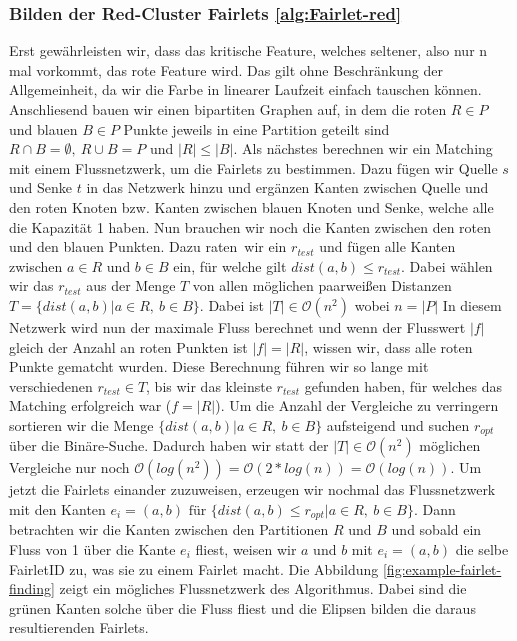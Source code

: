         \subsubsection{Bilden der Red-Cluster Fairlets \ref{alg:Fairlet-red}}
            Erst gewährleisten wir, dass das kritische Feature, welches seltener, also nur n mal vorkommt, das rote Feature wird. Das gilt ohne Beschränkung der Allgemeinheit, da wir die Farbe in linearer Laufzeit einfach tauschen können. \newline
            Anschliesend bauen wir einen bipartiten Graphen auf, in dem die roten $R \in P$ und blauen $B \in P$ Punkte jeweils in eine Partition geteilt sind $R \cap B = \emptyset, \ R \cup B = P$ und $|R| \leq |B|$. \newline
            Als nächstes berechnen wir ein Matching mit einem Flussnetzwerk, um die Fairlets zu bestimmen. Dazu fügen wir Quelle $s$ und Senke $t$ in das Netzwerk hinzu und ergänzen Kanten zwischen Quelle und den roten Knoten bzw. Kanten zwischen blauen Knoten und Senke, welche alle die Kapazität 1 haben. Nun brauchen wir noch die Kanten zwischen den roten und den blauen Punkten. Dazu \glqq raten\grqq \ wir ein $r_{test}$ und fügen alle Kanten zwischen $a \in R$ und $b \in B$ ein, für welche gilt $dist(a, b) \leq r_{test}$. Dabei wählen wir das $r_{test}$ aus der Menge $T$ von allen möglichen paarweißen Distanzen $ T = \{dist(a, b) | a \in R, \ b \in B\}$. Dabei ist $|T| \in \mathcal{O}(n^{2})$ wobei $n = |P|$\newline
            In diesem Netzwerk wird nun der maximale Fluss berechnet und wenn der Flusswert $|f|$ gleich der Anzahl an roten Punkten ist $|f| = |R|$, wissen wir, dass alle roten Punkte gematcht wurden. Diese Berechnung führen wir so lange mit verschiedenen $r_{test} \in T$, bis wir das kleinste $r_{test}$ gefunden haben, für welches das Matching erfolgreich war ($f = |R|$). \newline 
            Um die Anzahl der Vergleiche zu verringern sortieren wir die Menge $\{dist(a, b) | a \in R, \ b \in B\}$ aufsteigend und suchen $r_{opt}$ über die Binäre-Suche. Dadurch haben wir statt der $|T| \in \mathcal{O}(n^{2})$ möglichen Vergleiche nur noch $\mathcal{O}(log(n^{2})) = \mathcal{O}(2*log(n)) = \mathcal{O}(log(n))$. \newline
            Um jetzt die Fairlets einander zuzuweisen, erzeugen wir nochmal das Flussnetzwerk mit den Kanten $e_i = (a, b) \textrm{ für } \{dist(a, b) \leq r_{opt}| a \in R, \ b \in B\}$. Dann betrachten wir die Kanten zwischen den Partitionen $R$ und $B$ und sobald ein Fluss von 1 über die Kante $e_i$ fliest, weisen wir $a$ und $b$ mit $e_i = (a, b)$ die selbe FairletID zu, was sie zu einem Fairlet macht. \newline
            Die Abbildung \ref{fig:example-fairlet-finding} zeigt ein mögliches Flussnetzwerk des Algorithmus. Dabei sind die grünen Kanten solche über die Fluss fliest und die Elipsen bilden die daraus resultierenden Fairlets.


